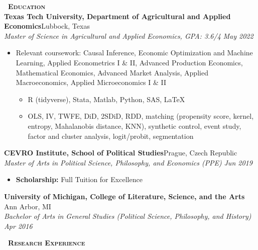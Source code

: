 \documentclass[a4paper,11pt]{article}
\newcommand{\header} [1] {
    \vspace{0.5mm}
    {\textsc{\textbf{\Large{\xrfill[0.5ex]{0.5pt}~#1~\xrfill[0.5ex]{0.5pt}}}}} %
}
\begin{document}
\header{Education} \\
\vspace{0.5mm}
\textbf{Texas Tech University, Department of Agricultural and Applied Economics}\hfill Lubbock, Texas\\
\textit{Master of Science in Agricultural and Applied Economics, GPA: 3.6/4} \hfill  \textit{May 2022} \\
\begin{itemize}
    \item Relevant coursework: Causal Inference, Economic Optimization and Machine Learning, Applied Econometrics I \& II, Advanced Production Economics, Mathematical Economics, Advanced Market Analysis, Applied Macroeconomics, Applied Microeconomics I \& II
    \begin{itemize}
        \item R (tidyverse), Stata, Matlab, Python, SAS, \LaTeX
        \item OLS, IV, TWFE, DiD, 2SDiD, RDD, matching (propensity score, kernel, entropy, Mahalanobis distance,  KNN), synthetic control, event study, factor and cluster analysis, logit/probit, segmentation
    \end{itemize}
\end{itemize}
\vspace{0.5mm}

\textbf{CEVRO Institute, School of Political Studies}\hfill Prague, Czech Republic\\
\textit{Master of Arts in Political Science, Philosophy, and Economics (PPE)} \hfill  \textit{Jun 2019}\\
\begin{itemize}
    \item \textbf{Scholarship:} Full Tuition for Excellence
\end{itemize}
\vspace{0.5mm}

\textbf{University of Michigan, College of Literature, Science, and the Arts} \hfill Ann Arbor, MI\\
\textit{Bachelor of Arts in General Studies (Political Science, Philosophy, and History)} \hfill  \textit{Apr 2016}\\

\vspace{0.5mm}

\header{Research Experience} \\
\vspace{0.5mm}
\end{document}

